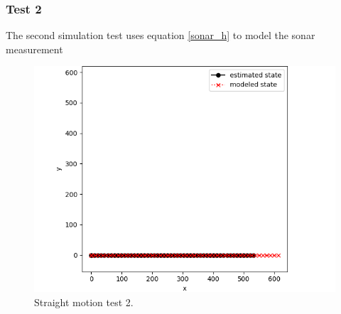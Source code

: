 \subsubsection{Test 2}

The second simulation test uses equation \ref{sonar_h} to model the sonar measurement

\begin{figure}[!htb]
	\begin{center}
		\includegraphics[scale=0.480]{imgs/ekf_straight_motion_2.png}
	\end{center}
	\caption{ Straight motion test 2.}
	\label{ekf_straight_motion_2}
\end{figure}

